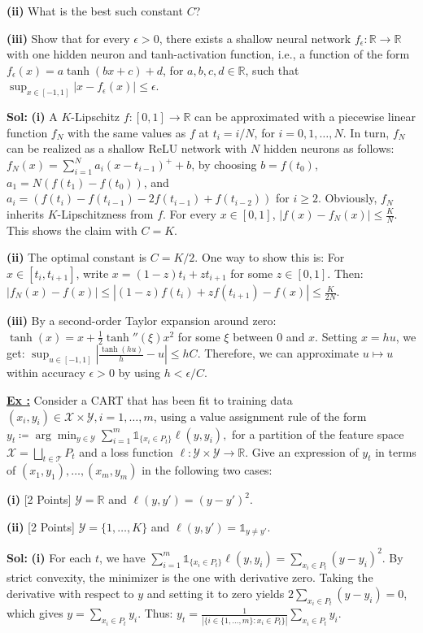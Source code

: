 \documentclass[a4paper,10pt]{article}
\newcounter{exerciseCounter}
\newcommand{\exercise}[1]{%
    \vspace{1mm}
    \stepcounter{exerciseCounter}%
    \color{exerciseBlack}
    \textbf{\underline{Ex \theexerciseCounter:}} #1
}
\newcommand{\solution}[1]{%
    {\color{solutionGray} \textbf{Sol: } #1} %
}
\begin{document}
\begin{scriptsize}
{\textbf{(ii)} What is the best such constant $C$?

\textbf{(iii)} Show that for every $\epsilon > 0$, there exists a shallow neural network $f_\epsilon : \mathbb{R} \to \mathbb{R}$ with one hidden neuron and tanh-activation function, i.e., a function of the form
$f_\epsilon(x) = a \tanh(bx + c) + d$, for $a, b, c, d \in \mathbb{R}$, such that $\sup_{x \in [-1,1]} |x - f_\epsilon(x)| \leq \epsilon$.}
\solution{
\textbf{(i)} A $K$-Lipschitz $f : [0,1] \to \mathbb{R}$ can be approximated with a piecewise linear function $f_N$ with the same values as $f$ at $t_i = i/N$, for $i = 0, 1, \dots, N$. In turn, $f_N$ can be realized as a shallow ReLU network with $N$ hidden neurons as follows:
$f_N(x) = \sum_{i=1}^N a_i(x - t_{i-1})^+ + b$, by choosing $b = f(t_0)$, $a_1 = N(f(t_1) - f(t_0))$, \color{solutionGray} and $a_i = (f(t_i) - f(t_{i-1}) - 2f(t_{i-1}) + f(t_{i-2}))$ for $i \geq 2$. Obviously, $f_N$ inherits $K$-Lipschitzness from $f$. For every $x \in [0,1]$, $|f(x) - f_N(x)| \leq \frac{K}{N}$. This shows the claim with $C = K$.

\textbf{(ii)} The optimal constant is $C = K/2$. One way to show this is:
For $x \in [t_i, t_{i+1}]$, write $x = (1-z)t_i + zt_{i+1}$ for some $z \in [0,1]$. Then:
$|f_N(x) - f(x)| \leq |(1-z)f(t_i) + zf(t_{i+1}) - f(x)| \leq \frac{K}{2N}$.

\textbf{(iii)} By a second-order Taylor expansion around zero:
$\tanh(x) = x + \frac{1}{2}\tanh''(\xi)x^2$ for some $\xi$ between $0$ and $x$. Setting $x = hu$, we get:
$\sup_{u \in [-1,1]} \left| \frac{\tanh(hu)}{h} - u \right| \leq hC$. Therefore, we can approximate $u \mapsto u$ within accuracy $\epsilon > 0$ by using $h < \epsilon / C$.}

\exercise{Consider a CART that has been fit to training data $(x_i, y_i) \in \mathcal{X} \times \mathcal{Y}, i = 1, \dots, m$, using a value assignment rule of the form
$
y_t \coloneqq \arg\min_{y \in \mathcal{Y}} \sum_{i=1}^m \mathbb{1}_{\{x_i \in P_t\}} \ell(y, y_i),
$
for a partition of the feature space $\mathcal{X} = \bigsqcup_{t \in \mathcal{T}} P_t$ and a loss function $\ell : \mathcal{Y} \times \mathcal{Y} \to \mathbb{R}$. Give an expression of $y_t$ in terms of $(x_1, y_1), \dots, (x_m, y_m)$ in the following two cases:

\textbf{(i)} [2 Points] $\mathcal{Y} = \mathbb{R}$ and $\ell(y, y') = (y - y')^2$.

\textbf{(ii)} [2 Points] $\mathcal{Y} = \{1, \dots, K\}$ and $\ell(y, y') = \mathbb{1}_{y \neq y'}$.}
\solution{
\textbf{(i)} For each $t$, we have $\sum_{i=1}^m \mathbb{1}_{\{x_i \in P_t\}} \ell(y, y_i) = \sum_{x_i \in P_t} (y - y_i)^2$. By strict convexity, the minimizer is the one with derivative zero. Taking the derivative with respect to $y$ and setting it to zero yields $2 \sum_{x_i \in P_t} (y - y_i) = 0$, which gives $y = \sum_{x_i \in P_t} y_i$. Thus:
$
y_t = \frac{1}{|\{i \in \{1, \dots, m\} : x_i \in P_t\}|} \sum_{x_i \in P_t} y_i.
$

}
\end{scriptsize}
\end{document}
